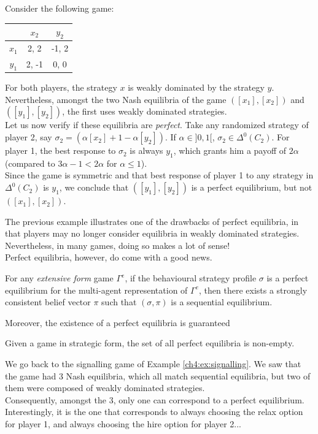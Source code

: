 \begin{example}
Consider the following game:
\begin{center}
\begin{tabular}{c | c  c}
& $x_2$ & $y_2$ \\
\hline
$x_1$ & 2, 2 & -1, 2 \\
$y_1$ & 2, -1 & 0, 0
\end{tabular}
\end{center}
For both players, the strategy $x$ is weakly dominated by the strategy $y$.
Nevertheless, amongst the two Nash equilibria of the game $([x_1],[x_2])$ and $([y_1],[y_2])$, the first uses weakly dominated strategies. \\
Let us now verify if these equilibria are \emph{perfect}.
Take  any randomized strategy of player 2, say $\sigma_2 = (\alpha [x_2] + 1- \alpha [y_2])$. If $\alpha \in ]0,1[$, $\sigma_2 \in \Delta^0(C_2)$. For player 1, the best response to $\sigma_2$ is always $y_1$, which grants him a payoff of $2 \alpha$ (compared to $3\alpha - 1 < 2 \alpha$ for $\alpha \leq 1$).\\
Since the game is symmetric and that  best response of player 1 to any strategy in $\Delta^0(C_2)$ is $y_1$, we conclude that $([y_1], [y_2])$ is a perfect equilibrium, but not $([x_1],[x_2])$.
\end{example}

The previous example illustrates one of the drawbacks of perfect equilibria, in that players may no longer consider equilibria in weakly dominated strategies. Nevertheless, in many games, doing so makes a lot of sense!\\
Perfect equilibria, however, do come with a good news.
\begin{theorem}
For any \emph{extensive form} game $\Gamma^e$, if the behavioural strategy profile $\sigma$  is a perfect equilibrium for the multi-agent representation of $\Gamma^e$, then there exists a strongly consistent belief vector $\pi$ such that $(\sigma, \pi)$ is a sequential equilibrium.
\end{theorem}

Moreover, the existence of a perfect equilibria is guaranteed
\begin{theorem}
Given a game in strategic form, the set of all perfect equilibria is non-empty.
\end{theorem}
\begin{example}
We go back to the signalling game of Example \ref{ch4:ex:signalling}.
We saw that the game had 3 Nash equilibria, which all match sequential equilibria, but two of them were composed of weakly dominated strategies. \\
Consequently, amongst the 3, only one can correspond to a perfect equilibrium.
Interestingly, it is the one that corresponds to always choosing the relax option for player 1, and always choosing the hire option for player 2...
\end{example}

